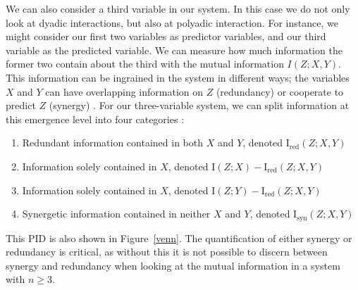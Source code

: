 \documentclass[../main.tex]{subfiles}
\begin{document}
We can also consider a third variable in our system.
In this case we do not only look at dyadic interactions, but also at polyadic interaction.
For instance, we might consider our first two variables as predictor variables, and our third variable as the predicted variable.
We can measure how much information the former two contain about the third with the mutual information $I(Z;X,Y)$.
This information can be ingrained in the system in different ways; the variables $X$ and $Y$ can have overlapping information on $Z$ (redundancy) or cooperate to predict $Z$ (synergy) \cite{griffith2014quantifying}.
For our three-variable system, we can split information at this emergence level into four categories \cite{williams2010nonnegative}: %
%
\begin{enumerate}
\item Redundant information contained in both $X$ and $Y$, denoted $\mathrm{I}_\mathrm{red}(Z;X,Y)$
\item Information solely contained in $X$, denoted $\mathrm{I}(Z; X) - \mathrm{I}_\mathrm{red}(Z;X,Y)$
\item Information solely contained in $X$, denoted $\mathrm{I}(Z; Y) - \mathrm{I}_\mathrm{red}(Z;X,Y)$
\item Synergetic information contained in neither $X$ and $Y$, denoted $\mathrm{I}_\mathrm{syn}(Z;X,Y)$
\end{enumerate}
This PID is also shown in Figure~\ref{venn}.
The quantification of either synergy or redundancy is critical, as without this it is not possible to discern between synergy and redundancy when looking at the mutual information in a system with $n \ge 3$.

\def\firstcircle{(0:-0.9cm) circle (2cm)}
\def\secondcircle{(0:0cm) circle (3cm)}
\def\thirdcircle{(0:0.9cm) circle (2cm)}
\end{document}
